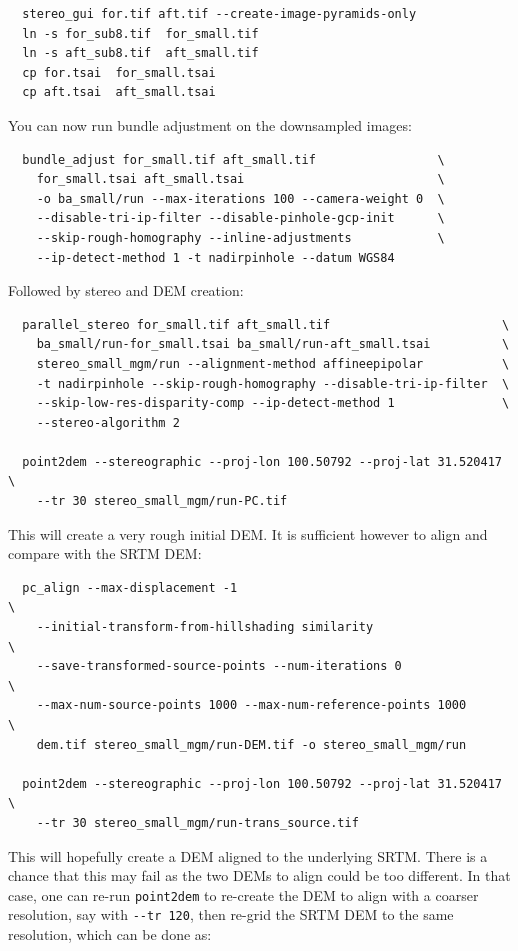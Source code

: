 \begin{verbatim}
  stereo_gui for.tif aft.tif --create-image-pyramids-only
  ln -s for_sub8.tif  for_small.tif
  ln -s aft_sub8.tif  aft_small.tif
  cp for.tsai  for_small.tsai
  cp aft.tsai  aft_small.tsai
\end{verbatim}

You can now run bundle adjustment on the downsampled images:

\begin{verbatim}
  bundle_adjust for_small.tif aft_small.tif                 \
    for_small.tsai aft_small.tsai                           \
    -o ba_small/run --max-iterations 100 --camera-weight 0  \
    --disable-tri-ip-filter --disable-pinhole-gcp-init      \
    --skip-rough-homography --inline-adjustments            \
    --ip-detect-method 1 -t nadirpinhole --datum WGS84
\end{verbatim}

Followed by stereo and DEM creation:

\begin{verbatim}
  parallel_stereo for_small.tif aft_small.tif                        \
    ba_small/run-for_small.tsai ba_small/run-aft_small.tsai          \
    stereo_small_mgm/run --alignment-method affineepipolar           \
    -t nadirpinhole --skip-rough-homography --disable-tri-ip-filter  \
    --skip-low-res-disparity-comp --ip-detect-method 1               \
    --stereo-algorithm 2 

  point2dem --stereographic --proj-lon 100.50792 --proj-lat 31.520417 \
    --tr 30 stereo_small_mgm/run-PC.tif
\end{verbatim}

This will create a very rough initial DEM. It is sufficient however
to align and compare with the SRTM DEM:

\begin{verbatim}
  pc_align --max-displacement -1                                      \
    --initial-transform-from-hillshading similarity                   \
    --save-transformed-source-points --num-iterations 0               \
    --max-num-source-points 1000 --max-num-reference-points 1000      \
    dem.tif stereo_small_mgm/run-DEM.tif -o stereo_small_mgm/run

  point2dem --stereographic --proj-lon 100.50792 --proj-lat 31.520417 \
    --tr 30 stereo_small_mgm/run-trans_source.tif
\end{verbatim}

This will hopefully create a DEM aligned to the underlying SRTM. There
is a chance that this may fail as the two DEMs to align could be too
different. In that case, one can re-run \texttt{point2dem} to re-create
the DEM to align with a coarser resolution, say with \texttt{-\/-tr
120}, then re-grid the SRTM DEM to the same resolution, which can be
done as:

